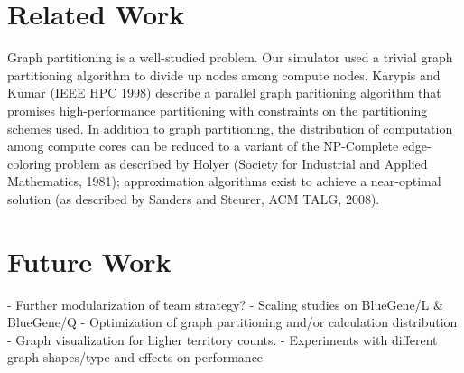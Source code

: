 \documentclass[10pt]{article}
\begin{document}
\begin{multicols}{2}
		\section*{Related Work}
		Graph partitioning is a well-studied problem.  Our simulator used a trivial graph partitioning algorithm to divide up nodes among compute nodes.  Karypis and Kumar (IEEE HPC 1998) describe a parallel graph paritioning algorithm that promises high-performance partitioning with constraints on the partitioning schemes used.  In addition to graph partitioning, the distribution of computation among compute cores can be reduced to a variant of the NP-Complete edge-coloring problem as described by Holyer (Society for Industrial and Applied Mathematics, 1981); approximation algorithms exist to achieve a near-optimal solution (as described by Sanders and Steurer, ACM TALG, 2008).

		\section*{Future Work}
		 - Further modularization of team strategy?
		 - Scaling studies on BlueGene/L \& BlueGene/Q
		 - Optimization of graph partitioning and/or calculation distribution
		 - Graph visualization for higher territory counts.
		 - Experiments with different graph shapes/type and effects on performance



	\end{multicols}
\end{document}
